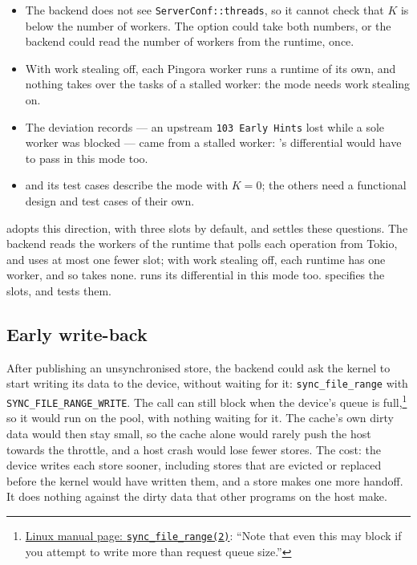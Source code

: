 \begin{itemize}
  \item The backend does not see \texttt{ServerConf::threads}, so it cannot
    check that $K$ is below the number of workers. The option could take
    both numbers, or the backend could read the number of workers from the
    runtime, once.
  \item With work stealing off, each Pingora worker runs a runtime of its
    own, and nothing takes over the tasks of a stalled worker: the mode
    needs work stealing on.
  \item The deviation  records --- an
    upstream \texttt{103 Early Hints} lost while a sole worker was blocked
    --- came from a stalled worker: 's
    differential would have to pass in this mode too.
  \item {} and its test cases describe the mode
    with $K = 0$; the others need a functional design and test cases of their
    own.
\end{itemize}
 adopts this direction, with three
slots by default, and settles these questions. The backend reads the
workers of the runtime that polls each operation from Tokio, and uses at
most one fewer slot; with work stealing off, each runtime has one worker,
and so takes none.  runs its differential in
this mode too.  specifies the slots, and
 tests them.

\subsection{Early write-back}
\label{app:executor-writeback}

After publishing an unsynchronised store, the backend could ask the kernel
to start writing its data to the device, without waiting for it:
\texttt{sync\_file\_range} with \texttt{SYNC\_FILE\_RANGE\_WRITE}. The call
can still block when the device's queue is
full,\footnote{\href{https://man7.org/linux/man-pages/man2/sync_file_range.2.html}{Linux
manual page: \texttt{sync\_file\_range(2)}}: ``Note that even this may block
if you attempt to write more than request queue size.''} so it would run on
the pool, with nothing waiting for it. The cache's own dirty data would then
stay small, so the cache alone would rarely push the host towards the
throttle, and a host crash would lose fewer stores. The cost: the device
writes each store sooner, including stores that are evicted or replaced
before the kernel would have written them, and a store makes one more
handoff. It does nothing against the dirty data that other programs on the
host make.

